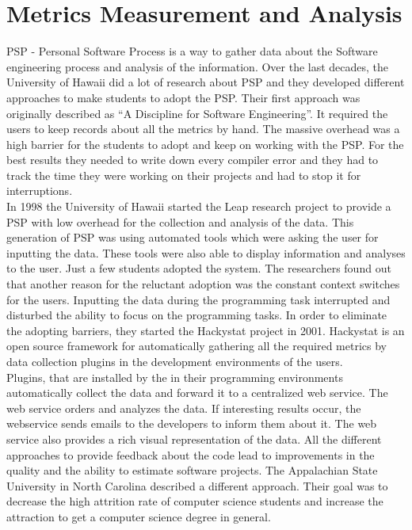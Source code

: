 \section{Metrics Measurement and Analysis}
PSP - Personal Software Process is a way to gather data about the Software engineering process and analysis of the information.
Over the last decades, the University of Hawaii did a lot of research about PSP and they developed different approaches to make students to adopt the PSP.
Their first approach was originally described as “A Discipline for Software Engineering”. It required the users to keep records about all the metrics by hand. The massive overhead was a high barrier for the students to adopt and keep on working with the PSP. For the best results they needed to write down every compiler error and they had to track the time they were working on their projects and had to stop it for interruptions.\\
In 1998 the University of Hawaii started the Leap research project to provide a PSP with low overhead for the collection and analysis of the data. This generation of PSP was using automated tools which were asking the user for inputting the data. These tools were also able to display information and analyses to the user.
Just a few students adopted the system. The researchers found out that another reason for the reluctant adoption was the constant context switches for the users. Inputting the data during the programming task interrupted and disturbed the ability to focus on the programming tasks. \cite{johnson2003beyond}
In order to eliminate the adopting barriers, they started the Hackystat project in 2001. Hackystat is an open source framework for automatically gathering all the required metrics by data collection plugins in the development environments of the users.\\
Plugins, that are installed by the in their programming environments automatically collect the data and forward it to a centralized web service. The web service orders and analyzes the data. If interesting results occur, the webservice sends emails to the developers to inform them about it. The web service also provides a rich visual representation of the data.
All the different approaches to provide feedback about the code lead to improvements in the quality and the ability to estimate software projects. \cite{johnson2001project} 
The Appalachian State University in North Carolina described a different approach. Their goal was to decrease the high attrition rate of computer science students and increase the attraction to get a computer science degree in general.\\
